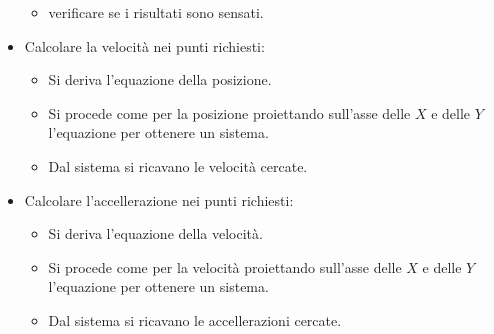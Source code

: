 \begin{itemize}
\begin{itemize}
        \item verificare se i risultati sono sensati.
    \end{itemize}
    \item Calcolare la velocità nei punti richiesti:
    \begin{itemize}
        \item Si deriva l'equazione della posizione.
        \item Si procede come per la posizione proiettando sull'asse delle $X$ e delle $Y$ l'equazione per ottenere un sistema.
        \item Dal sistema si ricavano le velocità cercate.
    \end{itemize}
    \item Calcolare l'accellerazione nei punti richiesti:
    \begin{itemize}
        \item Si deriva l'equazione della velocità.
        \item Si procede come per la velocità proiettando sull'asse delle $X$ e delle $Y$ l'equazione per ottenere un sistema.
        \item Dal sistema si ricavano le accellerazioni cercate.
    \end{itemize}
\end{itemize}